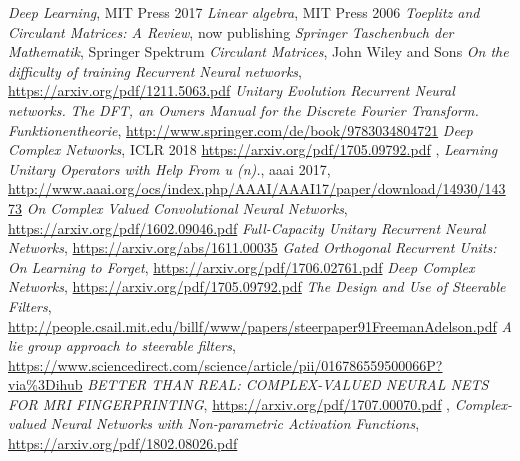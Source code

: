 \documentclass{article}
\begin{document}
\begin{thebibliography}{9}
 \emph{Deep Learning},
MIT Press 2017
 \emph{Linear algebra},
MIT Press 2006
 \emph{Toeplitz and Circulant Matrices: A Review},
now publishing
 \emph{Springer Taschenbuch der Mathematik}, Springer Spektrum
 \emph{Circulant Matrices}, John Wiley and Sons
 \emph{On the difficulty of training Recurrent Neural networks}, \url{https://arxiv.org/pdf/1211.5063.pdf}
 \emph{Unitary Evolution Recurrent Neural networks.}
 \emph{The DFT, an Owners Manual for the Discrete Fourier Transform.}
 \emph{Funktionentheorie}, \url{http://www.springer.com/de/book/9783034804721}
 \emph{Deep Complex Networks}, ICLR 2018 \url{https://arxiv.org/pdf/1705.09792.pdf}
, \emph{Learning Unitary Operators with Help From u (n).}, aaai 2017, \url{http://www.aaai.org/ocs/index.php/AAAI/AAAI17/paper/download/14930/14373}
 \emph{On Complex Valued Convolutional Neural Networks}, \url{https://arxiv.org/pdf/1602.09046.pdf}
 \emph{Full-Capacity Unitary Recurrent Neural Networks}, \url{https://arxiv.org/abs/1611.00035}
 \emph{Gated Orthogonal Recurrent Units: On Learning to Forget}, \url{https://arxiv.org/pdf/1706.02761.pdf}
 \emph{Deep Complex Networks}, \url{https://arxiv.org/pdf/1705.09792.pdf}
 \emph{The Design and Use of Steerable Filters}, \url{http://people.csail.mit.edu/billf/www/papers/steerpaper91FreemanAdelson.pdf}
 \emph{A lie group approach to steerable filters}, \url{https://www.sciencedirect.com/science/article/pii/016786559500066P?via%3Dihub}
 \emph{BETTER THAN REAL: COMPLEX-VALUED NEURAL NETS FOR MRI FINGERPRINTING}, \url{https://arxiv.org/pdf/1707.00070.pdf}
, \emph{Complex-valued Neural Networks with Non-parametric Activation Functions}, \url{https://arxiv.org/pdf/1802.08026.pdf}
\end{thebibliography}
\end{document}
